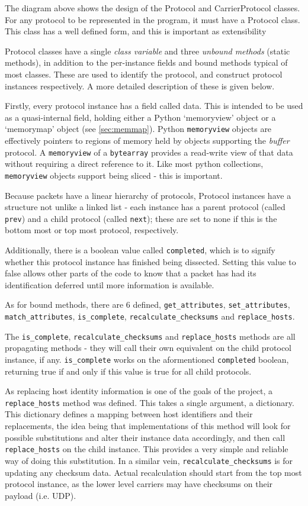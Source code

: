 \documentclass[10pt,a4paper,notitlepage]{report}
\begin{document}
The diagram above shows the design of the Protocol and CarrierProtocol classes. For any protocol to be represented in the program, it must have a Protocol class. This class has a well defined form, and this is important as extensibility 

Protocol classes have a single \emph{class variable} and three \emph{unbound methods} (static methods), in addition to the per-instance fields and bound methods typical of most classes. These are used to identify the protocol, and construct protocol instances respectively. A more detailed description of these is given below.

Firstly, every protocol instance has a field called data. This is intended to be used as a quasi-internal field, holding either a Python `memoryview' object or a `memorymap' object (see \ref{sec:memmap}). Python \texttt{memoryview} objects are effectively pointers to regions of memory held by objects supporting the \emph{buffer} protocol. A \texttt{memoryview} of a \texttt{bytearray} provides a read-write view of that data without requiring a direct reference to it. Like most python collections, \texttt{memoryview} objects support being sliced - this is important.

Because packets have a linear hierarchy of protocols, Protocol instances have a structure not unlike a linked list - each instance has a parent protocol (called \texttt{prev}) and a child protocol (called \texttt{next}); these are set to none if this is the bottom most or top most protocol, respectively.

Additionally, there is a boolean value called \texttt{completed}, which is to signify whether this protocol instance has finished being dissected. Setting this value to false allows other parts of the code to know that a packet has had its identification deferred until more information is available.

As for bound methods, there are 6 defined, \texttt{get_attributes}, \texttt{set_attributes}, \texttt{match_attributes}, \texttt{is_complete}, \texttt{recalculate_checksums} and \texttt{replace_hosts}.

The \texttt{is_complete}, \texttt{recalculate_checksums} and \texttt{replace_hosts} methods are all propagating methods - they will call their own equivalent on the child protocol instance, if any. \texttt{is_complete} works on the aformentioned \texttt{completed} boolean, returning true if and only if this value is true for all child protocols.

As replacing host identity information is one of the goals of the project, a \texttt{replace_hosts} method was defined. This takes a single argument, a dictionary. This dictionary defines a mapping between host identifiers and their replacements, the idea being that implementations of this method will look for possible substitutions and alter their instance data accordingly, and then call \texttt{replace_hosts} on the child instance. This provides a very simple and reliable way of doing this substitution. In a similar vein, \texttt{recalculate_checksums} is for updating any checksum data. Actual recalculation should start from the top most protocol instance, as the lower level carriers may have checksums on their payload (i.e. UDP).
\end{document}
